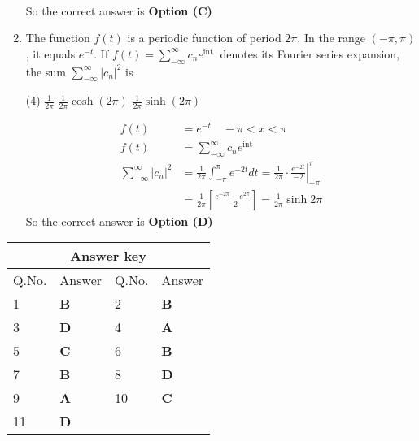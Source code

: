 \begin{enumerate}[label=\color{ocre}\textbf{\arabic*.}]
\begin{answer}
\begin{align*}
		\end{align*}
		So the correct answer is \textbf{Option (C)}
	\end{answer}
	\item The function $f(t)$ is a periodic function of period $2 \pi$. In the range $(-\pi, \pi)$, it equals $e^{-t}$. If $f(t)=\sum_{-\infty}^{\infty} c_{n} e^{\text {int }}$ denotes its Fourier series expansion, the sum $\sum_{-\infty}^{\infty}\left|c_{n}\right|^{2}$ is
	{}
	\begin{tasks}(4)
		\task[\textbf{B.}] $\frac{1}{2 \pi}$
		\task[\textbf{C.}] $\frac{1}{2 \pi} \cosh (2 \pi)$
		\task[\textbf{D.}]  $\frac{1}{2 \pi} \sinh (2 \pi)$
	\end{tasks}
	\begin{answer}
		\begin{align*}
		f(t)&=e^{-t} \quad-\pi<x<\pi\\
		f(t)&=\sum_{-\infty}^{\infty} c_{n} e^{\mathrm{int}}\\
		\sum_{-\infty}^{\infty}\left|c_{n}\right|^{2}&=\frac{1}{2 \pi} \int_{-\pi}^{\pi} e^{-2 t} d t=\left.\frac{1}{2 \pi} \cdot \frac{e^{-2 t}}{-2}\right|_{-\pi} ^{\pi}\\&=\frac{1}{2 \pi}\left[\frac{e^{-2 \pi}-e^{2 \pi}}{-2}\right]=\frac{1}{2 \pi} \sinh 2 \pi
		\end{align*}
		So the correct answer is \textbf{Option (D)}
	\end{answer}
\end{enumerate}
\setlength\arrayrulewidth{1pt}
\begin{table}[H]
	\centering
	\begin{tabular}{|p{1.5cm}|p{1.5cm}||p{1.5cm}|p{1.5cm}|}
		\hline
		\multicolumn{4}{|c|}{\textbf{Answer key}}\\\hline\hline
		\rowcolor{ocrel}Q.No.&Answer&Q.No.&Answer\\\hline
		1&\textbf{B} &2&\textbf{B}\\\hline 
		3&\textbf{D} &4&\textbf{A} \\\hline
		5&\textbf{C} &6&\textbf{B} \\\hline
		7&\textbf{B}&8&\textbf{D}\\\hline
		9&\textbf{A}&10&\textbf{C}\\\hline
		11&\textbf{D} &&\textbf{}\\\hline
		
	\end{tabular}
\end{table}

